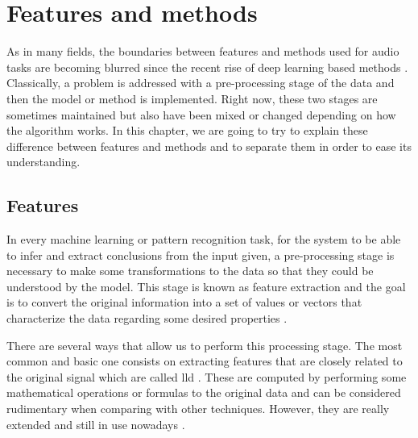 
\section{Features and methods}
	
	As in many fields, the boundaries between features and methods used for audio tasks are becoming blurred since the recent rise of deep learning based methods . Classically, a problem is addressed with a pre-processing stage of the data and then the model or method is implemented. Right now, these two stages are sometimes maintained but also have been mixed or changed depending on how the algorithm works. In this chapter, we are going to try to explain these difference between features and methods and to separate them in order to ease its understanding.

\subsection{Features}
\label{subsection:features}

	In every machine learning or pattern recognition task, for the system to be able to infer and extract conclusions from the input given, a pre-processing stage is necessary to make some transformations to the data so that they could be understood by the model. This stage is known as feature extraction and the goal is to convert the original information into a set of values or vectors that characterize the data regarding some desired properties \cite{Giannakopoulos2014}.
	
	There are several ways that allow us to perform this processing stage. The most common and basic one consists on extracting features that are closely related to the original signal which are called \acrfull{lld}  \cite{Amatriain2004}. These are computed by performing some mathematical operations or formulas to the original data and can be considered rudimentary when comparing with other techniques. However, they are really extended and still in use nowadays \cite{Marr1982}. 
	
